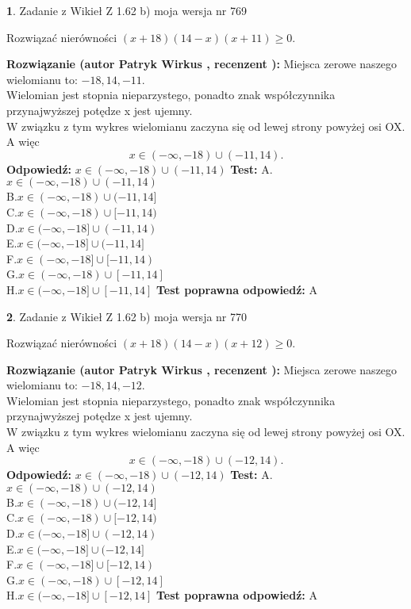 \documentclass[12pt, a4paper]{article}
\theoremstyle{definition} %
\newtheorem{zad}{}
\newcommand{\zadStart}[1]{\begin{zad}#1\newline}
\newcommand{\zadStop}{\end{zad}}
\newcommand{\rozwStart}[2]{\noindent \textbf{Rozwiązanie (autor #1 , recenzent #2): }\newline}
\newcommand{\rozwStop}{\newline}
\newcommand{\odpStart}{\noindent \textbf{Odpowiedź:}\newline}
\newcommand{\odpStop}{\newline}
\newcommand{\testStart}{\noindent \textbf{Test:}\newline}
\newcommand{\testStop}{\newline}
\newcommand{\kluczStart}{\noindent \textbf{Test poprawna odpowiedź:}\newline}
\newcommand{\kluczStop}{\newline}
\begin{document}
\zadStart{Zadanie z Wikieł Z 1.62 b) moja wersja nr 769}

Rozwiązać nierówności $(x+18)(14-x)(x+11)\ge0$.
\zadStop
\rozwStart{Patryk Wirkus}{}
Miejsca zerowe naszego wielomianu to: $-18, 14, -11$.\\
Wielomian jest stopnia nieparzystego, ponadto znak współczynnika przy\linebreak najwyższej potędze x jest ujemny.\\ W związku z tym wykres wielomianu zaczyna się od lewej strony powyżej osi OX. A więc $$x \in (-\infty,-18) \cup (-11,14).$$
\rozwStop
\odpStart
$x \in (-\infty,-18) \cup (-11,14)$
\odpStop
\testStart
A.$x \in (-\infty,-18) \cup (-11,14)$\\
B.$x \in (-\infty,-18) \cup (-11,14]$\\
C.$x \in (-\infty,-18) \cup [-11,14)$\\
D.$x \in (-\infty,-18] \cup (-11,14)$\\
E.$x \in (-\infty,-18] \cup (-11,14]$\\
F.$x \in (-\infty,-18] \cup [-11,14)$\\
G.$x \in (-\infty,-18) \cup [-11,14]$\\
H.$x \in (-\infty,-18] \cup [-11,14]$
\testStop
\kluczStart
A
\kluczStop



\zadStart{Zadanie z Wikieł Z 1.62 b) moja wersja nr 770}

Rozwiązać nierówności $(x+18)(14-x)(x+12)\ge0$.
\zadStop
\rozwStart{Patryk Wirkus}{}
Miejsca zerowe naszego wielomianu to: $-18, 14, -12$.\\
Wielomian jest stopnia nieparzystego, ponadto znak współczynnika przy\linebreak najwyższej potędze x jest ujemny.\\ W związku z tym wykres wielomianu zaczyna się od lewej strony powyżej osi OX. A więc $$x \in (-\infty,-18) \cup (-12,14).$$
\rozwStop
\odpStart
$x \in (-\infty,-18) \cup (-12,14)$
\odpStop
\testStart
A.$x \in (-\infty,-18) \cup (-12,14)$\\
B.$x \in (-\infty,-18) \cup (-12,14]$\\
C.$x \in (-\infty,-18) \cup [-12,14)$\\
D.$x \in (-\infty,-18] \cup (-12,14)$\\
E.$x \in (-\infty,-18] \cup (-12,14]$\\
F.$x \in (-\infty,-18] \cup [-12,14)$\\
G.$x \in (-\infty,-18) \cup [-12,14]$\\
H.$x \in (-\infty,-18] \cup [-12,14]$
\testStop
\kluczStart
A
\kluczStop
\end{document}
